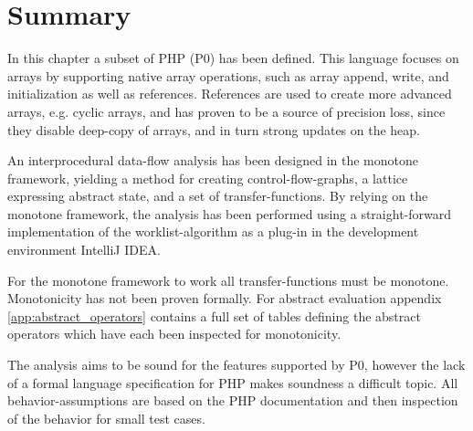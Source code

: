 \section{Summary}

In this chapter a subset of PHP (P0) has been defined. This language focuses on arrays by supporting native array operations, such as array append, write, and initialization as well as references. %
References are used to create more advanced arrays, e.g. cyclic arrays, and has proven to be a source of precision loss, since they disable deep-copy of arrays, and in turn strong updates on the heap. 

An interprocedural data-flow analysis has been designed in the monotone framework, yielding a method for creating control-flow-graphs, a lattice expressing abstract state, and a set of transfer-functions. By relying on the monotone framework, the analysis has been performed using a straight-forward implementation of the worklist-algorithm as a plug-in in the development environment IntelliJ IDEA. 

For the monotone framework to work all transfer-functions must be monotone. Monotonicity has not been proven formally. For abstract evaluation appendix \ref{app:abstract_operators} contains a full set of tables defining the abstract operators which have each been inspected for monotonicity.

The analysis aims to be sound for the features supported by P0, however the lack of a formal language specification for PHP makes soundness a difficult topic. All behavior-assumptions are based on the PHP documentation and then inspection of the behavior for small test cases.